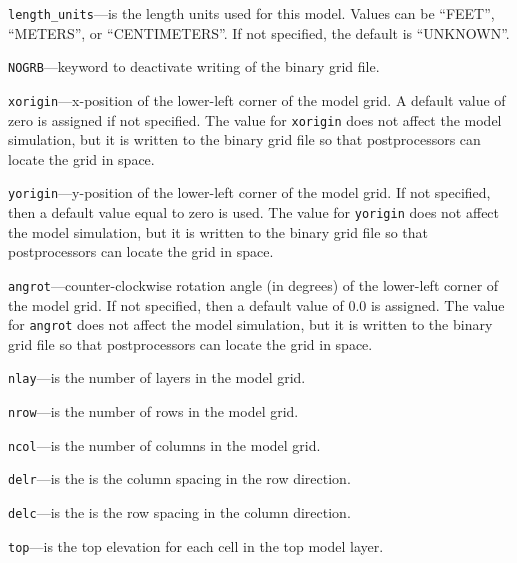 
\item \texttt{length\_units}---is the length units used for this model.  Values can be ``FEET'', ``METERS'', or ``CENTIMETERS''.  If not specified, the default is ``UNKNOWN''.

\item \texttt{NOGRB}---keyword to deactivate writing of the binary grid file.

\item \texttt{xorigin}---x-position of the lower-left corner of the model grid.  A default value of zero is assigned if not specified.  The value for \texttt{xorigin} does not affect the model simulation, but it is written to the binary grid file so that postprocessors can locate the grid in space.

\item \texttt{yorigin}---y-position of the lower-left corner of the model grid.  If not specified, then a default value equal to zero is used.  The value for \texttt{yorigin} does not affect the model simulation, but it is written to the binary grid file so that postprocessors can locate the grid in space.

\item \texttt{angrot}---counter-clockwise rotation angle (in degrees) of the lower-left corner of the model grid.  If not specified, then a default value of 0.0 is assigned.  The value for \texttt{angrot} does not affect the model simulation, but it is written to the binary grid file so that postprocessors can locate the grid in space.

\item \texttt{nlay}---is the number of layers in the model grid.

\item \texttt{nrow}---is the number of rows in the model grid.

\item \texttt{ncol}---is the number of columns in the model grid.

\item \texttt{delr}---is the is the column spacing in the row direction.

\item \texttt{delc}---is the is the row spacing in the column direction.

\item \texttt{top}---is the top elevation for each cell in the top model layer.


